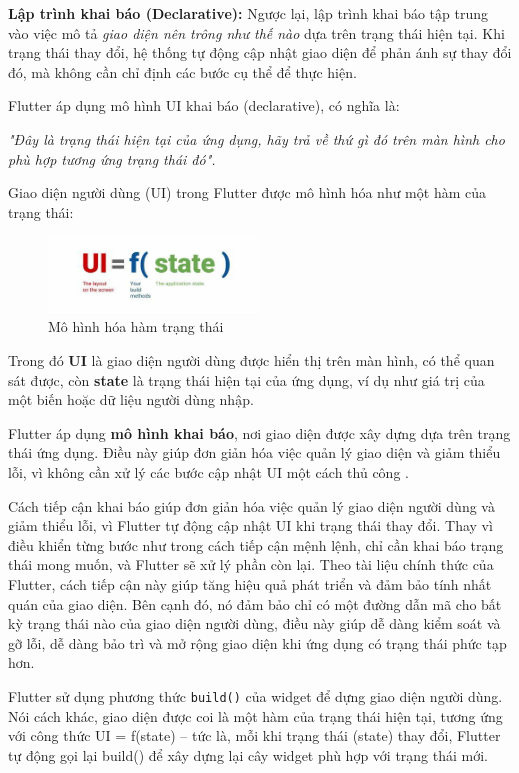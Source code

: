 \documentclass[../DoAn.tex]{subfiles}
\numberwithin{figure}{chapter}
\begin{document}
\textbf{Lập trình khai báo (Declarative):} Ngược lại, lập trình khai báo tập trung vào việc mô tả \textit{giao diện nên trông như thế nào} dựa trên trạng thái hiện tại. Khi trạng thái thay đổi, hệ thống tự động cập nhật giao diện để phản ánh sự thay đổi đó, mà không cần chỉ định các bước cụ thể để thực hiện.

Flutter áp dụng mô hình UI khai báo (declarative), có nghĩa là:

\textit{
"Đây là trạng thái hiện tại của ứng dụng, hãy trả về thứ gì đó trên màn hình cho phù hợp tương ứng trạng thái đó".
}

Giao diện người dùng (UI) trong Flutter được mô hình hóa như một hàm của trạng thái:
\begin{figure}[H]
    \centering
    \includegraphics[width=0.5\textwidth]{Hinhve/Chuong5/flutterState.jpg}
    \caption{Mô hình hóa hàm trạng thái}
    \label{fig:flutterstate}
\end{figure}
Trong đó \textbf{UI} là giao diện người dùng được hiển thị trên màn hình, có thể quan sát được, còn \textbf{state} là trạng thái hiện tại của ứng dụng, ví dụ như giá trị của một biến hoặc dữ liệu người dùng nhập.

Flutter áp dụng \textbf{mô hình khai báo}, nơi giao diện được xây dựng dựa trên trạng thái ứng dụng. Điều này giúp đơn giản hóa việc quản lý giao diện và giảm thiểu lỗi, vì không cần xử lý các bước cập nhật UI một cách thủ công .

Cách tiếp cận khai báo giúp đơn giản hóa việc quản lý giao diện người dùng và giảm thiểu lỗi, vì Flutter tự động cập nhật UI khi trạng thái thay đổi. Thay vì điều khiển từng bước như trong cách tiếp cận mệnh lệnh, chỉ cần khai báo trạng thái mong muốn, và Flutter sẽ xử lý phần còn lại. Theo tài liệu chính thức của Flutter, cách tiếp cận này giúp tăng hiệu quả phát triển và đảm bảo tính nhất quán của giao diện. Bên cạnh đó, nó đảm bảo chỉ có một đường dẫn mã cho bất kỳ trạng thái nào của giao diện người dùng, điều này giúp dễ dàng kiểm soát và gỡ lỗi, dễ dàng bảo trì và mở rộng giao diện khi ứng dụng có trạng thái phức tạp hơn.

Flutter sử dụng phương thức \texttt{build()} của widget để dựng giao diện người dùng. Nói cách khác, giao diện được coi là một hàm của trạng thái hiện tại, tương ứng với công thức UI = f(state) – tức là, mỗi khi trạng thái (state) thay đổi, Flutter tự động gọi lại build() để xây dựng lại cây widget phù hợp với trạng thái mới. 
\end{document}
